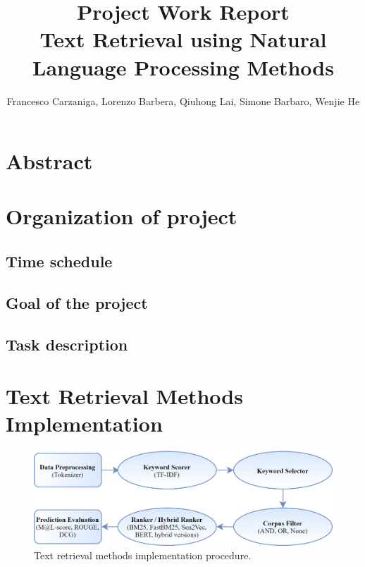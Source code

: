 \documentclass[10pt,a4paper,fleqn]{report}
\begin{document}
\title{Project Work Report \\
	Text Retrieval using Natural Language Processing Methods}
\author{Francesco Carzaniga, 
		Lorenzo Barbera, 
		Qiuhong Lai, 
		Simone Barbaro, 	
		Wenjie He}

\maketitle
\tableofcontents

\chapter*{Abstract}

\chapter{Organization of project}
	\section{Time schedule} 
	\section{Goal of the project}
	\section{Task description}	

\chapter{Text Retrieval Methods Implementation}			


	\begin{figure}[htbp]
		\centering
		\includegraphics[width=\textwidth]{figure/Implementation procedure.png}			
		\caption[]{Text retrieval methods implementation procedure.}
		\label{fig: implementation_procedure}
	\end{figure}
	
\end{document}
